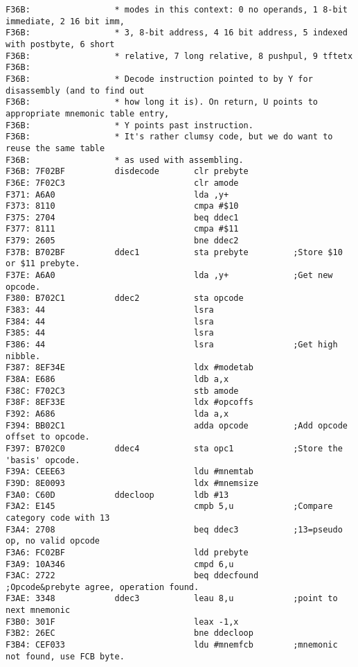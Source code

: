 {\begin{verbatim}
F36B:                 * modes in this context: 0 no operands, 1 8-bit immediate, 2 16 bit imm,
F36B:                 * 3, 8-bit address, 4 16 bit address, 5 indexed with postbyte, 6 short
F36B:                 * relative, 7 long relative, 8 pushpul, 9 tftetx
F36B:                 
F36B:                 * Decode instruction pointed to by Y for disassembly (and to find out
F36B:                 * how long it is). On return, U points to appropriate mnemonic table entry,
F36B:                 * Y points past instruction. 
F36B:                 * It's rather clumsy code, but we do want to reuse the same table
F36B:                 * as used with assembling.
F36B: 7F02BF          disdecode       clr prebyte
F36E: 7F02C3                          clr amode
F371: A6A0                            lda ,y+
F373: 8110                            cmpa #$10
F375: 2704                            beq ddec1
F377: 8111                            cmpa #$11
F379: 2605                            bne ddec2
F37B: B702BF          ddec1           sta prebyte         ;Store $10 or $11 prebyte.
F37E: A6A0                            lda ,y+             ;Get new opcode.
F380: B702C1          ddec2           sta opcode
F383: 44                              lsra
F384: 44                              lsra
F385: 44                              lsra
F386: 44                              lsra                ;Get high nibble.
F387: 8EF34E                          ldx #modetab
F38A: E686                            ldb a,x
F38C: F702C3                          stb amode
F38F: 8EF33E                          ldx #opcoffs
F392: A686                            lda a,x
F394: BB02C1                          adda opcode         ;Add opcode offset to opcode.               
F397: B702C0          ddec4           sta opc1            ;Store the 'basis' opcode.
F39A: CEEE63                          ldu #mnemtab
F39D: 8E0093                          ldx #mnemsize
F3A0: C60D            ddecloop        ldb #13
F3A2: E145                            cmpb 5,u            ;Compare category code with 13
F3A4: 2708                            beq ddec3           ;13=pseudo op, no valid opcode
F3A6: FC02BF                          ldd prebyte
F3A9: 10A346                          cmpd 6,u
F3AC: 2722                            beq ddecfound       ;Opcode&prebyte agree, operation found.
F3AE: 3348            ddec3           leau 8,u            ;point to next mnemonic
F3B0: 301F                            leax -1,x
F3B2: 26EC                            bne ddecloop        
F3B4: CEF033                          ldu #mnemfcb        ;mnemonic not found, use FCB byte.

\end{verbatim}}
